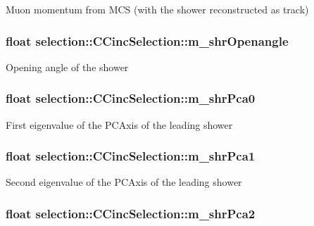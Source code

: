 Muon momentum from M\-C\-S (with the shower reconstructed as track) \hypertarget{classselection_1_1CCincSelection_ab64b76c5254ccd50d06ffed8ec5e9eeb}{
\subsubsection[{m\-\_\-shr\-Openangle}]{\setlength{\rightskip}{0pt plus 5cm}float selection\-::\-C\-Cinc\-Selection\-::m\-\_\-shr\-Openangle\hspace{0.3cm}{\ttfamily [private]}}}\label{classselection_1_1CCincSelection_ab64b76c5254ccd50d06ffed8ec5e9eeb}
Opening angle of the shower \hypertarget{classselection_1_1CCincSelection_a219fd1d882087e6c3b2913f92ef1fa5c}{
\subsubsection[{m\-\_\-shr\-Pca0}]{\setlength{\rightskip}{0pt plus 5cm}float selection\-::\-C\-Cinc\-Selection\-::m\-\_\-shr\-Pca0\hspace{0.3cm}{\ttfamily [private]}}}\label{classselection_1_1CCincSelection_a219fd1d882087e6c3b2913f92ef1fa5c}
First eigenvalue of the P\-C\-Axis of the leading shower \hypertarget{classselection_1_1CCincSelection_a997abb8c3f3fb209e34be49f108111f0}{
\subsubsection[{m\-\_\-shr\-Pca1}]{\setlength{\rightskip}{0pt plus 5cm}float selection\-::\-C\-Cinc\-Selection\-::m\-\_\-shr\-Pca1\hspace{0.3cm}{\ttfamily [private]}}}\label{classselection_1_1CCincSelection_a997abb8c3f3fb209e34be49f108111f0}
Second eigenvalue of the P\-C\-Axis of the leading shower \hypertarget{classselection_1_1CCincSelection_af63f02140b4cd41dc4e78cd57739c07a}{
\subsubsection[{m\-\_\-shr\-Pca2}]{\setlength{\rightskip}{0pt plus 5cm}float selection\-::\-C\-Cinc\-Selection\-::m\-\_\-shr\-Pca2\hspace{0.3cm}{\ttfamily [private]}}}\label{classselection_1_1CCincSelection_af63f02140b4cd41dc4e78cd57739c07a}
